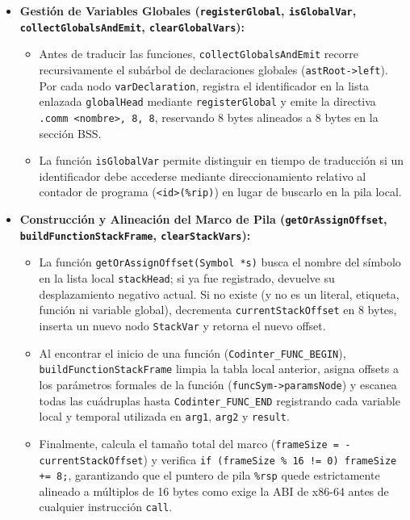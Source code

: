 \documentclass[12pt, a4paper]{article}
\begin{document}
\begin{itemize}
    \item \textbf{Gestión de Variables Globales (\texttt{registerGlobal}, \texttt{isGlobalVar}, \texttt{collectGlobalsAndEmit}, \texttt{clearGlobalVars}):}
    \begin{itemize}
        \item Antes de traducir las funciones, \texttt{collectGlobalsAndEmit} recorre recursivamente el subárbol de declaraciones globales (\texttt{astRoot->left}). Por cada nodo \texttt{varDeclaration}, registra el identificador en la lista enlazada \texttt{globalHead} mediante \texttt{registerGlobal} y emite la directiva \texttt{.comm <nombre>, 8, 8}, reservando 8 bytes alineados a 8 bytes en la sección BSS.
        \item La función \texttt{isGlobalVar} permite distinguir en tiempo de traducción si un identificador debe accederse mediante direccionamiento relativo al contador de programa (\texttt{<id>(\%rip)}) en lugar de buscarlo en la pila local.
    \end{itemize}

    \item \textbf{Construcción y Alineación del Marco de Pila (\texttt{getOrAssignOffset}, \texttt{buildFunctionStackFrame}, \texttt{clearStackVars}):}
    \begin{itemize}
        \item La función \texttt{getOrAssignOffset(Symbol *s)} busca el nombre del símbolo en la lista local \texttt{stackHead}; si ya fue registrado, devuelve su desplazamiento negativo actual. Si no existe (y no es un literal, etiqueta, función ni variable global), decrementa \texttt{currentStackOffset} en 8 bytes, inserta un nuevo nodo \texttt{StackVar} y retorna el nuevo offset.
        \item Al encontrar el inicio de una función (\texttt{Codinter\_FUNC\_BEGIN}), \texttt{buildFunctionStackFrame} limpia la tabla local anterior, asigna offsets a los parámetros formales de la función (\texttt{funcSym->paramsNode}) y escanea todas las cuádruplas hasta \texttt{Codinter\_FUNC\_END} registrando cada variable local y temporal utilizada en \texttt{arg1}, \texttt{arg2} y \texttt{result}.
        \item Finalmente, calcula el tamaño total del marco (\texttt{frameSize = -currentStackOffset}) y verifica \texttt{if (frameSize \% 16 != 0) frameSize += 8;}, garantizando que el puntero de pila \texttt{\%rsp} quede estrictamente alineado a múltiplos de 16 bytes como exige la ABI de x86-64 antes de cualquier instrucción \texttt{call}.
    \end{itemize}


\end{itemize}
\end{document}

